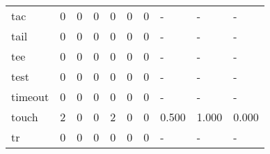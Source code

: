 \begin{longtable}{lp{1.3cm}p{1.3cm}p{1.3cm}p{1.3cm}p{1.3cm}p{1.3cm}p{1.3cm}p{1.3cm}p{1.3cm}}
tac       &                      0 &                                             0 &                                            0 &                                           0 &                                            0 &                                          0 &                                    - &                                      - &                                    - \\
tail      &                      0 &                                             0 &                                            0 &                                           0 &                                            0 &                                          0 &                                    - &                                      - &                                    - \\
tee       &                      0 &                                             0 &                                            0 &                                           0 &                                            0 &                                          0 &                                    - &                                      - &                                    - \\
test      &                      0 &                                             0 &                                            0 &                                           0 &                                            0 &                                          0 &                                    - &                                      - &                                    - \\
timeout   &                      0 &                                             0 &                                            0 &                                           0 &                                            0 &                                          0 &                                    - &                                      - &                                    - \\
touch     &                      2 &                                             0 &                                            0 &                                           2 &                                            0 &                                          0 &                                0.500 &                                  1.000 &                                0.000 \\
tr        &                      0 &                                             0 &                                            0 &                                           0 &                                            0 &                                          0 &                                    - &                                      - &                                    - \\

\end{longtable}
